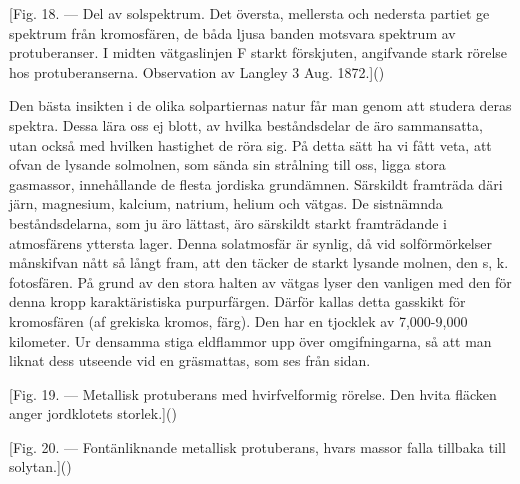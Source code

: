 \documentclass[a4paper, 12pt, oneside, swedish]{article}
\begin{document}
[Fig. 18. --- Del av solspektrum. Det översta, mellersta och nedersta partiet ge spektrum från kromosfären, de båda ljusa banden motsvara spektrum av protuberanser. I midten vätgaslinjen F starkt förskjuten, angifvande stark rörelse hos protuberanserna. Observation av Langley 3 Aug. 1872.]()

Den bästa insikten i de olika solpartiernas natur får man genom att studera deras spektra. Dessa lära oss ej blott, av hvilka beståndsdelar de äro sammansatta, utan också med hvilken hastighet de röra sig. På detta sätt ha vi fått veta, att ofvan de lysande solmolnen, som sända sin strålning till oss, ligga stora gasmassor, innehållande de flesta jordiska grundämnen. Särskildt framträda däri järn, magnesium, kalcium, natrium, helium och vätgas. De sistnämnda beståndsdelarna, som ju äro lättast, äro särskildt starkt framträdande i atmosfärens yttersta lager. Denna solatmosfär är synlig, då vid solförmörkelser månskifvan nått så långt fram, att den täcker de starkt lysande molnen, den s, k. fotosfären. På grund av den stora halten av vätgas lyser den vanligen med den för denna kropp karaktäristiska purpurfärgen. Därför kallas detta gasskikt för kromosfären (af grekiska kromos, färg). Den har en tjocklek av 7,000-9,000 kilometer. Ur densamma stiga eldflammor upp över omgifningarna, så att man liknat dess utseende vid en gräsmattas, som ses från sidan.

[Fig. 19. --- Metallisk protuberans med hvirfvelformig rörelse. Den hvita fläcken anger jordklotets storlek.]()

[Fig. 20. --- Fontänliknande metallisk protuberans, hvars massor falla tillbaka till solytan.]()
\end{document}
